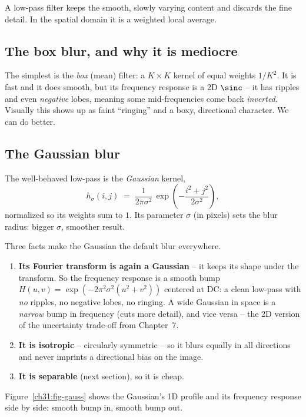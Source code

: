 A low-pass filter keeps the smooth, slowly varying content and discards the fine
detail. In the spatial domain it is a weighted local average.

\subsection{The box blur, and why it is mediocre}
The simplest is the \emph{box} (mean) filter: a $K\times K$ kernel of equal weights
$1/K^2$. It is fast and it does smooth, but its frequency response is a 2D
$\sinc$ -- it has ripples and even \emph{negative} lobes, meaning some
mid-frequencies come back \emph{inverted}. Visually this shows up as faint
``ringing'' and a boxy, directional character. We can do better.

\subsection{The Gaussian blur}
The well-behaved low-pass is the \emph{Gaussian} kernel,
\begin{equation}
h_\sigma(i,j) \;=\; \frac{1}{2\pi\sigma^2}\,
\exp\!\left(-\frac{i^2+j^2}{2\sigma^2}\right),
\label{ch31:gauss2d}
\end{equation}
normalized so its weights sum to $1$. Its parameter $\sigma$ (in pixels) sets the
blur radius: bigger $\sigma$, smoother result.

Three facts make the Gaussian the default blur everywhere.

\begin{enumerate}
\item \textbf{Its Fourier transform is again a Gaussian} -- it keeps its shape under
the transform. So the frequency response is a smooth bump
$H(u,v) = \exp(-2\pi^2\sigma^2(u^2+v^2))$ centered at DC: a clean low-pass with
\emph{no} ripples, no negative lobes, no ringing. A wide Gaussian in space is a
\emph{narrow} bump in frequency (cuts more detail), and vice versa -- the 2D version
of the uncertainty trade-off from Chapter~7.
\item \textbf{It is isotropic} -- circularly symmetric -- so it blurs equally in all
directions and never imprints a directional bias on the image.
\item \textbf{It is separable} (next section), so it is cheap.
\end{enumerate}

Figure~\ref{ch31:fig-gauss} shows the Gaussian's 1D profile and its frequency
response side by side: smooth bump in, smooth bump out.

